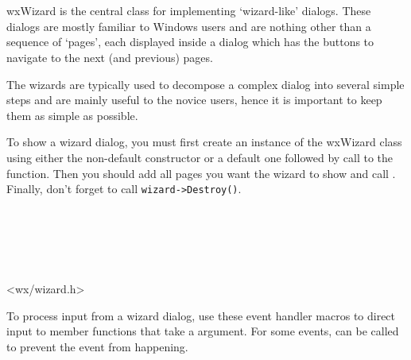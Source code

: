 
\section{}\label{wxwizard}

wxWizard is the central class for implementing `wizard-like' dialogs. These
dialogs are mostly familiar to Windows users and are nothing other than a
sequence of `pages', each displayed inside a dialog which has the
buttons to navigate to the next (and previous) pages.

The wizards are typically used to decompose a complex dialog into several
simple steps and are mainly useful to the novice users, hence it is important
to keep them as simple as possible.

To show a wizard dialog, you must first create an instance of the wxWizard class
using either the non-default constructor or a default one followed by call to the 
 function. Then you should add all pages you
want the wizard to show and call .
Finally, don't forget to call {\tt wizard->Destroy()}.


\\
\\
\\
\\


<wx/wizard.h>


To process input from a wizard dialog, use these event handler macros to
direct input to member functions that take a 
 argument. For some events, 
 can be called to prevent the event from
happening.

